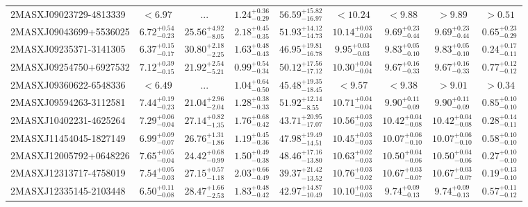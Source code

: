 \documentclass[onecolumn]{mn2e}
\begin{document}
{\begin{center}
\begin{longtable}{lcccccccc}
2MASXJ09023729-4813339 & $<6.97$ & ... & $1.24_{-0.29}^{+0.36}$ &$56.59_{-16.97}^{+15.82}$ & $<10.24$ & $<9.88$ & $>9.89$ & $>0.51$ \\
2MASXJ09043699+5536025 & $6.72_{-0.23}^{+0.54}$ & $25.56_{-8.05}^{+4.92}$ & $2.18_{-0.35}^{+0.45}$ &$51.93_{-14.73}^{+14.12}$ & $10.14_{-0.04}^{+0.03}$ & $9.69_{-0.44}^{+0.23}$ & $9.69_{-0.44}^{+0.23}$ & $0.65_{-0.29}^{+0.23}$ \\
2MASXJ09235371-3141305 & $6.37_{-0.17}^{+0.15}$ & $30.80_{-2.25}^{+2.18}$ & $1.63_{-0.43}^{+0.48}$ &$46.95_{-16.78}^{+19.81}$ & $9.95_{-0.03}^{+0.03}$ & $9.83_{-0.10}^{+0.05}$ & $9.83_{-0.10}^{+0.05}$ & $0.24_{-0.11}^{+0.17}$ \\
2MASXJ09254750+6927532 & $7.12_{-0.15}^{+0.39}$ & $21.92_{-5.21}^{+2.54}$ & $0.99_{-0.34}^{+0.54}$ &$50.12_{-17.12}^{+17.56}$ & $10.30_{-0.04}^{+0.04}$ & $9.67_{-0.33}^{+0.16}$ & $9.67_{-0.33}^{+0.16}$ & $0.77_{-0.12}^{+0.12}$ \\
2MASXJ09360622-6548336 & $<6.49$ & ... & $1.04_{-0.50}^{+0.64}$ &$45.48_{-18.45}^{+19.35}$ & $<9.57$ & $<9.38$ & $>9.01$ & $>0.34$ \\
2MASXJ09594263-3112581 & $7.44_{-0.23}^{+0.19}$ & $21.04_{-2.04}^{+2.96}$ & $1.28_{-0.33}^{+0.38}$ &$51.92_{-8.55}^{+12.14}$ & $10.71_{-0.04}^{+0.04}$ & $9.90_{-0.09}^{+0.11}$ & $9.90_{-0.09}^{+0.11}$ & $0.85_{-0.10}^{+0.10}$ \\
2MASXJ10402231-4625264 & $7.29_{-0.04}^{+0.06}$ & $27.14_{-1.35}^{+0.82}$ & $1.76_{-0.42}^{+0.68}$ &$43.71_{-17.07}^{+20.95}$ & $10.56_{-0.03}^{+0.03}$ & $10.42_{-0.08}^{+0.04}$ & $10.42_{-0.08}^{+0.04}$ & $0.28_{-0.11}^{+0.14}$ \\
2MASXJ11454045-1827149 & $6.99_{-0.07}^{+0.09}$ & $26.76_{-1.86}^{+1.31}$ & $1.19_{-0.36}^{+0.45}$ &$47.98_{-14.51}^{+19.49}$ & $10.45_{-0.03}^{+0.03}$ & $10.07_{-0.10}^{+0.06}$ & $10.07_{-0.10}^{+0.06}$ & $0.58_{-0.10}^{+0.10}$ \\
2MASXJ12005792+0648226 & $7.65_{-0.04}^{+0.05}$ & $24.42_{-0.99}^{+0.68}$ & $1.50_{-0.38}^{+0.49}$ &$48.46_{-13.80}^{+17.16}$ & $10.63_{-0.03}^{+0.02}$ & $10.50_{-0.06}^{+0.04}$ & $10.50_{-0.06}^{+0.04}$ & $0.27_{-0.10}^{+0.10}$ \\
2MASXJ12313717-4758019 & $7.54_{-0.03}^{+0.05}$ & $27.15_{-1.18}^{+0.57}$ & $2.03_{-0.49}^{+0.66}$ &$39.37_{-13.52}^{+21.42}$ & $10.76_{-0.02}^{+0.03}$ & $10.67_{-0.07}^{+0.03}$ & $10.67_{-0.07}^{+0.03}$ & $0.19_{-0.10}^{+0.13}$ \\
2MASXJ12335145-2103448 & $6.50_{-0.08}^{+0.11}$ & $28.47_{-2.53}^{+1.66}$ & $1.83_{-0.42}^{+0.48}$ &$42.97_{-10.49}^{+14.87}$ & $10.10_{-0.03}^{+0.03}$ & $9.74_{-0.13}^{+0.09}$ & $9.74_{-0.13}^{+0.09}$ & $0.57_{-0.12}^{+0.11}$ \\

\end{longtable}
\end{center}}
\end{document}
